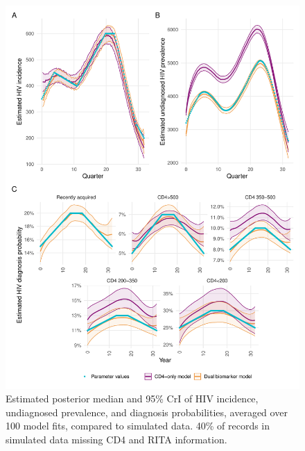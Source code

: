 \begin{figure}
  \centering
  \includegraphics[width=\textwidth]{sim_estimates_miss.pdf}
  \caption[Estimated posterior median and 95\% CrI of HIV incidence, undiagnosed prevalence, and diagnosis probabilities]{Estimated posterior median and 95\% CrI of HIV incidence, undiagnosed prevalence, and diagnosis probabilities, averaged over 100 model fits, compared to simulated data. 40\% of records in simulated data missing CD4 and RITA information.}\label{fig:sim_estimates_miss}
\end{figure}

